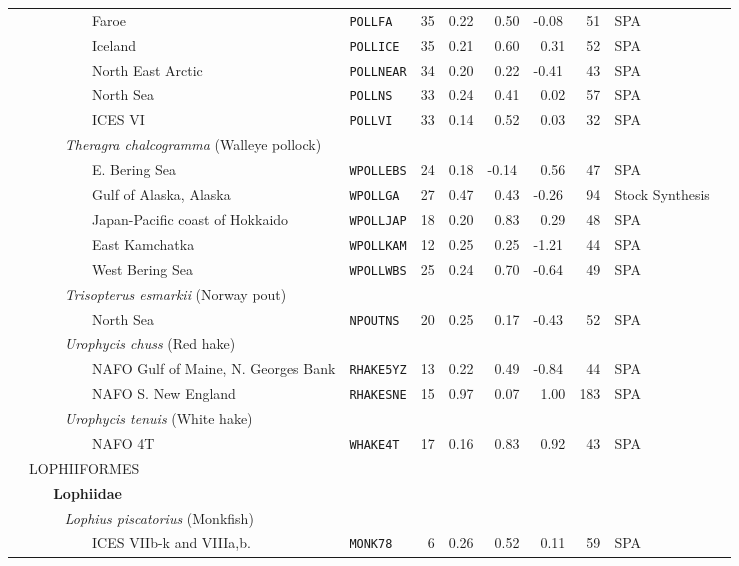 \begin{flushleft}
\begin{tabular*}{7.1in}{llllllllll}
&~~~~~~~~~Faroe&{\tt POLLFA}&35&0.22&~0.50&-0.08&~51&SPA  & \\ 
&~~~~~~~~~Iceland&{\tt POLLICE}&35&0.21&~0.60&~0.31&~52&SPA  & \\ 
&~~~~~~~~~North East Arctic&{\tt POLLNEAR}&34&0.20&~0.22&-0.41&~43&SPA  & \\ 
&~~~~~~~~~North Sea&{\tt POLLNS}&33&0.24&~0.41&~0.02&~57&SPA  & \\ 
&~~~~~~~~~ICES VI&{\tt POLLVI}&33&0.14&~0.52&~0.03&~32&SPA  & \\ 
&{\it~~~~~Theragra chalcogramma} (Walleye pollock)&~&~&~&~&~&~&~  & \\ 
&~~~~~~~~~E. Bering Sea&{\tt WPOLLEBS}&24&0.18&-0.14&~0.56&~47&SPA  & \\ 
&~~~~~~~~~Gulf of Alaska, Alaska&{\tt WPOLLGA}&27&0.47&~0.43&-0.26&~94&Stock Synthesis  & \\ 
&~~~~~~~~~Japan-Pacific coast of Hokkaido&{\tt WPOLLJAP}&18&0.20&~0.83&~0.29&~48&SPA  & \\ 
&~~~~~~~~~East Kamchatka&{\tt WPOLLKAM}&12&0.25&~0.25&-1.21&~44&SPA  & \\ 
&~~~~~~~~~West Bering Sea&{\tt WPOLLWBS}&25&0.24&~0.70&-0.64&~49&SPA  & \\ 
&{\it~~~~~Trisopterus esmarkii} (Norway pout)&~&~&~&~&~&~&~  & \\ 
&~~~~~~~~~North Sea&{\tt NPOUTNS}&20&0.25&~0.17&-0.43&~52&SPA  & \\ 
&{\it~~~~~Urophycis chuss} (Red hake)&~&~&~&~&~&~&~  & \\ 
&~~~~~~~~~NAFO Gulf of Maine, N. Georges Bank&{\tt RHAKE5YZ}&13&0.22&~0.49&-0.84&~44&SPA  & \\ 
&~~~~~~~~~NAFO S. New England&{\tt RHAKESNE}&15&0.97&~0.07&~1.00&183&SPA  & \\ 
&{\it~~~~~Urophycis tenuis} (White hake)&~&~&~&~&~&~&~  & \\ 
&~~~~~~~~~NAFO 4T&{\tt WHAKE4T}&17&0.16&~0.83&~0.92&~43&SPA  & \\ 
&{\normalsize LOPHIIFORMES}&~&~&~&~&~&~&~  & \\ 
&{\bf~~~Lophiidae}&~&~&~&~&~&~&~  & \\ 
&{\it~~~~~Lophius piscatorius} (Monkfish)&~&~&~&~&~&~&~  & \\ 
&~~~~~~~~~ICES VIIb-k and VIIIa,b.&{\tt MONK78}&~6&0.26&~0.52&~0.11&~59&SPA  & \\ 
\end{tabular*} 
\end{flushleft}
\newpage
